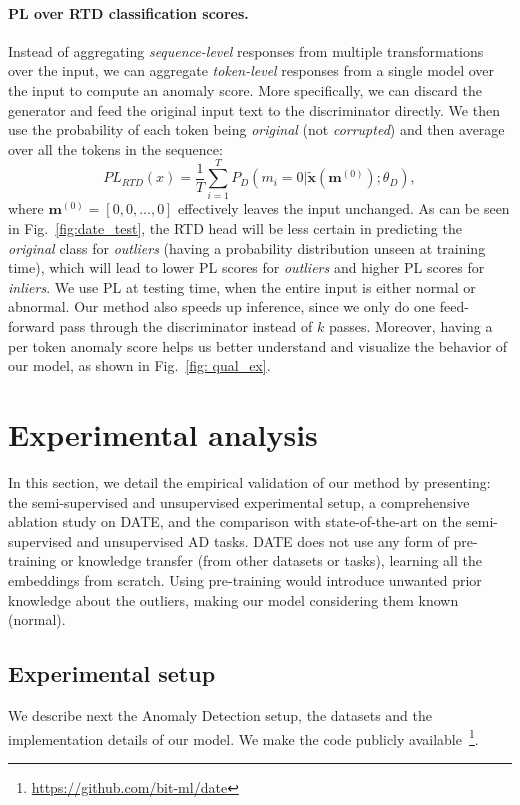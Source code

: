\documentclass[11pt]{article}
\newcommand{\bx}{\bm{x}}
\begin{document}
\paragraph{PL over RTD classification scores.} Instead of aggregating \emph{sequence-level} responses from multiple transformations over the input, we can aggregate \emph{token-level} responses from a single model over the input to compute an anomaly score. More specifically, we can discard the generator and feed the original input text to the discriminator directly. We then use the probability of each token being \emph{original} (not \emph{corrupted}) and then average over all the tokens in the sequence:
\begin{equation}
    \label{eq: PL_score}
    PL_{RTD}(x) = \frac{1}{T} \sum_{i=1}^T
    P_D(m_i=0|\bm{\widetilde{\bx}}(\bm{m}^{(0)});\theta_D),
\end{equation}
where $\bm{m}^{(0)}=[0, 0, ..., 0]$ effectively leaves the input unchanged.
As can be seen in Fig.~\ref{fig:date_test}, the RTD head will be less certain in predicting the \emph{original} class for \emph{outliers} (having a probability distribution unseen at training time), which will lead to lower PL scores for \emph{outliers} and higher PL scores for \emph{inliers}. We use PL at testing time, when the entire input is either normal or abnormal. Our method also speeds up inference, since we only do one feed-forward pass through the discriminator instead of $k$ passes. Moreover, having a per token anomaly score helps us better understand and visualize the behavior of our model, as shown in Fig.~\ref{fig: qual_ex}.


\section{Experimental analysis}
In this section, we detail the empirical validation of our method by presenting: the semi-supervised and unsupervised experimental setup, a comprehensive ablation study on DATE, and the comparison with state-of-the-art on the semi-supervised and unsupervised AD tasks. DATE does not use any form of pre-training or knowledge transfer (from other datasets or tasks), learning all the embeddings from scratch. Using pre-training would introduce unwanted prior knowledge about the outliers, making our model considering them known (normal).


\subsection{Experimental setup}
We describe next the Anomaly Detection setup, the datasets and the implementation details of our model. We make the code publicly available~\footnote{\url{https://github.com/bit-ml/date}}.
\end{document}
